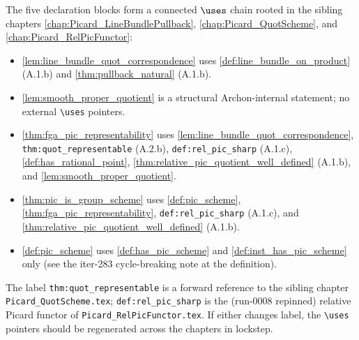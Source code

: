 The five declaration blocks form a connected \(\uses\) chain rooted in the
sibling chapters \cref{chap:Picard_LineBundlePullback},
\cref{chap:Picard_QuotScheme}, and \cref{chap:Picard_RelPicFunctor}:
\begin{itemize}
  \item \cref{lem:line_bundle_quot_correspondence} uses
    \cref{def:line_bundle_on_product} (A.1.b) and
    \cref{thm:pullback_natural} (A.1.b).
  \item \cref{lem:smooth_proper_quotient} is a structural Archon-internal
    statement; no external \texttt{\textbackslash uses} pointers.
  \item \cref{thm:fga_pic_representability} uses
    \cref{lem:line_bundle_quot_correspondence},
    \texttt{thm:quot\_representable} (A.2.b),
    \texttt{def:rel\_pic\_sharp} (A.1.c),
    \cref{def:has_rational_point},
    \cref{thm:relative_pic_quotient_well_defined} (A.1.b), and
    \cref{lem:smooth_proper_quotient}.
  \item \cref{thm:pic_is_group_scheme} uses
    \cref{def:pic_scheme}, \cref{thm:fga_pic_representability},
    \texttt{def:rel\_pic\_sharp} (A.1.c), and
    \cref{thm:relative_pic_quotient_well_defined} (A.1.b).
  \item \cref{def:pic_scheme} uses
    \cref{def:has_pic_scheme} and \cref{def:inst_has_pic_scheme} only
    (see the iter-283 cycle-breaking note at the definition).
\end{itemize}
The label \texttt{thm:quot\_representable} is a forward reference to the
sibling chapter \texttt{Picard\_QuotScheme.tex};
\texttt{def:rel\_pic\_sharp} is the (run-0008 repinned) relative Picard
functor of \texttt{Picard\_RelPicFunctor.tex}. If either changes label,
the \texttt{\textbackslash uses} pointers should be regenerated across
the chapters in lockstep.
